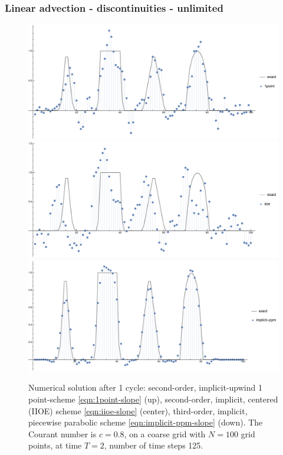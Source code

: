 \documentclass[../thesis.tex]{subfiles}
\begin{document}
\subsubsection{Linear advection - discontinuities - unlimited}
\begin{figure}[H]
	\centering
	\includegraphics[width=\textwidth]{fig-1point-c0p8-T2-limit0-shu.pdf}
	\includegraphics[width=\textwidth]{fig-iioe-c0p8-T2-limit0-shu.pdf}
	\includegraphics[width=\textwidth]{fig-implicit-ppm-c0p8-T2-limit0-shu.pdf}
	\caption{Numerical solution after 1 cycle: second-order, implicit-upwind 1 point-scheme \eqref{eqn:1point-slope} (up), second-order, implicit, centered (IIOE) scheme \eqref{eqn:iioe-slope} (center), third-order, implicit, piecewise parabolic scheme \eqref{eqn:implicit-ppm-slope} (down). The Courant number is \(c = 0.8\), on a coarse grid with \(N = 100\) grid points, at time \(T = 2\), number of time steps 125.}
	\label{fig:c0p8-T2-limit0-shu}
\end{figure}
\end{document}

